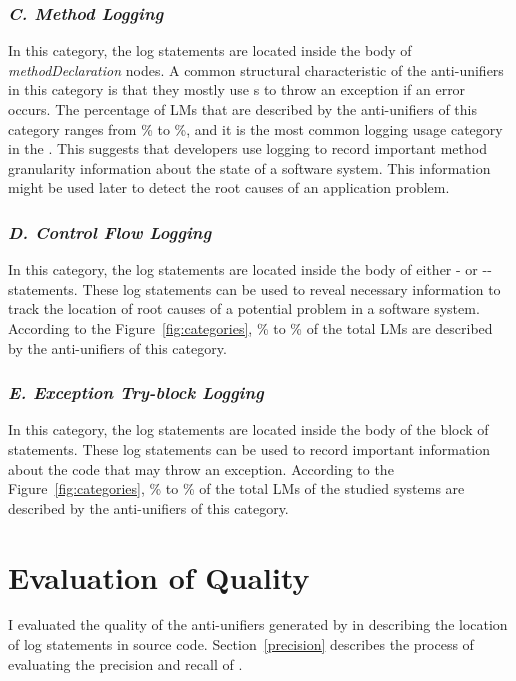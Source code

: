 \subsubsection{\emph{C. Method Logging}}  \label{method logging}
In this category, the log statements are located inside the body of \textsl{methodDeclaration} nodes. A common structural characteristic of the anti-unifiers in this category is that they mostly use s to throw an exception if an error occurs. The percentage of LMs that are described by the anti-unifiers of this category ranges from \% to \%, and it is the most common logging usage category in the . This suggests that developers use logging to record important method granularity information about the state of a software system. This information might be used later to detect the root causes of an application problem.



\subsubsection{\emph{D. Control Flow Logging}}  \label{Exception try-block logging}
In this category, the log statements are located inside the body of either - or --statements. These log statements can be used to reveal necessary information to track the location of root causes of a potential problem in a software system. According to the Figure~\ref{fig:categories}, \% to \% of the total LMs are described by the anti-unifiers of this category.


\subsubsection{\emph{E. Exception Try-block Logging}}  \label{Exception try-block logging}
In this category, the log statements are located inside the body of the  block of  statements. These log statements can be used to record important information about the code that may throw an exception. According to the Figure~\ref{fig:categories}, \% to \% of the total LMs of the studied systems are described by the anti-unifiers of this category.



\section{Evaluation of Quality}  \label{evaluation}
I evaluated the quality of the anti-unifiers generated by  in describing the location of log statements in source code. Section~\ref{precision} describes the process of evaluating the precision and recall of .


